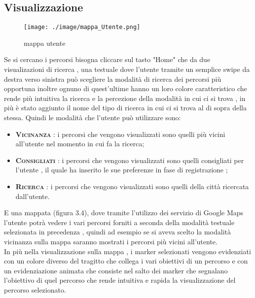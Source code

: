 \subsection{Visualizzazione}
\vspace{2em}
\begin{wrapfigure}{R}{0.45\textwidth}
\centering
\texttt{[image: ./image/mappa\_Utente.png]}
\caption{\label{fig:mappa utente}mappa utente}
\end{wrapfigure}
Se si cercano i percorsi bisogna cliccare sul tasto "Home"
che da due visualizazioni di ricerca , una testuale dove l'utente tramite un semplice swipe da destra verso sinistra può scegliere la modalità di ricerca dei percorsi più opportuna inoltre ognuno di quest'ultime hanno un loro 
colore caratteristico che rende più intuitiva la ricerca e la percezione della modalità in cui ci si trova , in più è stato aggiunto il nome del tipo di ricerca in cui ci si trova al di sopra della stessa.
Quindi le modalità che l'utente può utilizzare sono:\\[0.2cm]

\begin{itemize}  

\item \textsc{\bfseries Vicinanza} : i percorsi che vengono visualizzati sono quelli più vicini all'utente nel momento in cui fa la ricerca;\\
\item \textsc{\bfseries Consigliati} : i percorsi che vengono visualizzati sono quelli consigliati per l'utente , il quale ha inserito le sue preferenze in fase di registrazione ;\\
\item \textsc{\bfseries Ricerca} :  i percorsi che vengono visualizzati sono quelli della città ricercata dall'utente.\\

\end{itemize}

E una mappata (figura 3.4), dove tramite l'utilizzo dei servizio di Google Maps l'utente potrà vedere i vari percorsi forniti a seconda della modalità testuale selezionata in precedenza , quindi ad esempio se si aveva scelto la modalità vicinanza sulla mappa saranno mostrati i percorsi più vicini all'utente.\\
In più nella visualizzazione sulla mappa , i marker selezionati vengono evidenziati con un colore diverso del tragitto che collega i vari obiettivi di un percorso e con un evidenziazione animata che consiste nel salto dei marker che segnalano l'obiettivo di quel percorso che rende intuitiva e rapida la visualizzazione del percorso selezionato.\\

